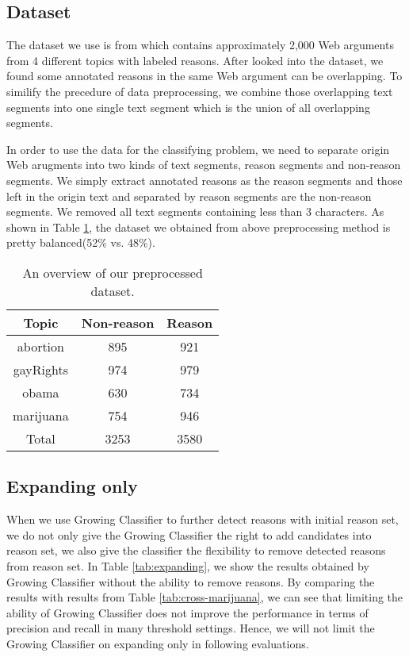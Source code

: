 \documentclass[11pt,a4paper]{article}
\begin{document}
\subsection{Dataset}

The dataset we use is from\cite{hasan2014you} which contains approximately 2,000 Web arguments from 4 different topics with labeled reasons. After looked into the dataset, we found some annotated reasons in the same Web argument can be overlapping. To similify the precedure of data preprocessing, we combine those overlapping text segments into one single text segment which is the union of all overlapping segments. 

In order to use the data for the classifying problem, we need to separate origin Web arugments into two kinds of text segments, reason segments and non-reason segments. We simply extract annotated reasons as the reason segments and those left in the origin text and separated by reason segments are the non-reason segments. We removed all text segments containing less than 3 characters. As shown in Table \ref{tab:dataset}, the dataset we obtained from above preprocessing method is pretty balanced(52\% vs. 48\%).

\begin{table}[h]
\begin{center}
\begin{tabular}{|c||c|c|}
\hline \bf Topic & \bf Non-reason & \bf Reason\\ \hline\hline
abortion  & 895  & 921  \\
gayRights & 974  & 979  \\
obama     & 630  & 734  \\
marijuana & 754  & 946  \\
Total     & 3253 & 3580 \\ 
\hline
\end{tabular}
\end{center}
\caption{\label{tab:dataset} An overview of our preprocessed dataset.}
\end{table}

\subsection{Expanding only}

When we use Growing Classifier to further detect reasons with initial reason set, we do not only give the Growing Classifier the right to add candidates into reason set, we also give the classifier the flexibility to remove detected reasons from reason set. In Table \ref{tab:expanding}, we show the results obtained by Growing Classifier without the ability to remove reasons. By comparing the results with results from Table \ref{tab:cross-marijuana}, we can see that limiting the ability of Growing Classifier does not improve the performance in terms of precision and recall in many threshold settings. Hence, we will not limit the Growing Classifier on expanding only in following evaluations. 
\end{document}
